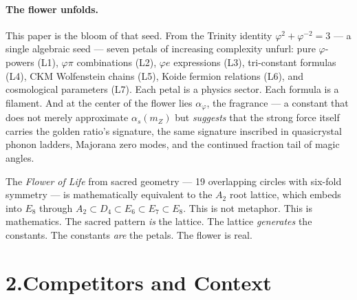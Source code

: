 \documentclass[10pt,a4paper]{article}
\begin{document}
\paragraph{The flower unfolds.}
This paper is the bloom of that seed.
From the Trinity identity $\varphi^2 + \varphi^{-2} = 3$ --- a single
algebraic seed --- seven petals of increasing complexity unfurl:
pure $\varphi$-powers (L1), $\varphi\pi$ combinations (L2),
$\varphi e$ expressions (L3), tri-constant formulas (L4),
CKM Wolfenstein chains (L5), Koide fermion relations (L6),
and cosmological parameters (L7).
Each petal is a physics sector. Each formula is a filament.
And at the center of the flower lies $\alpha_\varphi$, the fragrance ---
a constant that does not merely approximate $\alpha_s(m_Z)$ but
\emph{suggests} that the strong force itself carries the golden ratio's
signature, the same signature inscribed in quasicrystal phonon ladders,
Majorana zero modes, and the continued fraction tail of magic angles.

The \textit{Flower of Life} from sacred geometry --- 19 overlapping circles
with six-fold symmetry --- is mathematically equivalent to the $A_2$ root
lattice, which embeds into $E_8$ through
$A_2 \subset D_4 \subset E_6 \subset E_7 \subset E_8$.
This is not metaphor. This is mathematics.
The sacred pattern \emph{is} the lattice. The lattice \emph{generates}
the constants. The constants \emph{are} the petals.
The flower is real.

\section*{2.\quad Competitors and Context}
\end{document}
